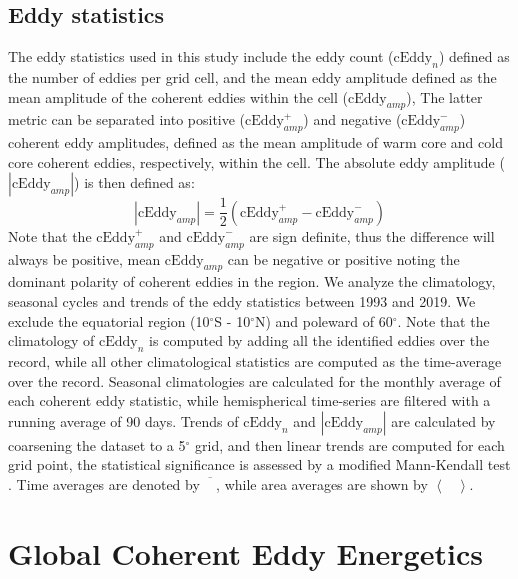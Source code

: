 \documentclass[draft,linenumbers]{agujournal2019}
\begin{document}
	\subsection{Eddy statistics}

	The eddy statistics used in this study include the eddy count ($\mathrm{cEddy}_{n}$) defined as the number of eddies per grid cell, and the mean eddy amplitude defined as the mean amplitude of the coherent eddies within the cell ($\mathrm{cEddy}_{amp}$), The latter metric can be separated into positive ($\mathrm{cEddy}_{amp}^{+}$) and negative ($\mathrm{cEddy}_{amp}^{-}$) coherent eddy amplitudes, defined as the mean amplitude of warm core and cold core coherent eddies, respectively, within the cell. 
	The absolute eddy amplitude ($|\mathrm{cEddy}_{amp}|$) is then defined as:
	\begin{equation}
	|\mathrm{cEddy}_{amp}| = \frac{1}{2} \left(\mathrm{cEddy}_{amp}^{+} -  \mathrm{cEddy}_{amp}^{-} \right)
	\end{equation}
	Note that the $\mathrm{cEddy}_{amp}^{+}$ and $\mathrm{cEddy}_{amp}^{-}$ are sign definite, thus the difference will always be positive, mean $\mathrm{cEddy}_{amp}$ can be negative or positive noting the dominant polarity of coherent eddies in the region. We analyze the climatology, seasonal cycles and trends of the eddy statistics between 1993 and 2019. We exclude the equatorial region (10$^\circ$S - 10$^\circ$N) and poleward of 60$^\circ$. Note that the climatology of $\mathrm{cEddy}_{n}$ is computed by adding all the identified eddies over the record, while all other climatological statistics are computed as the time-average over the record.  Seasonal climatologies are calculated for the monthly average of each coherent eddy statistic, while hemispherical time-series are filtered with a running average of 90 days. Trends of $\mathrm{cEddy}_{n}$ and $|\mathrm{cEddy}_{amp}|$ are calculated by coarsening the dataset to a 5$^\circ$ grid, and then linear trends are computed for each grid point, the statistical significance is assessed by a modified Mann-Kendall test \citep{Sheng_MK_2004}. Time averages are denoted by $\overline{\phantom{X}}$, while area averages are shown by $\left< \phantom{X}\right>$.

	\section{Global Coherent Eddy Energetics}
	\label{subsec:CEKE_climatology}

\end{document}
